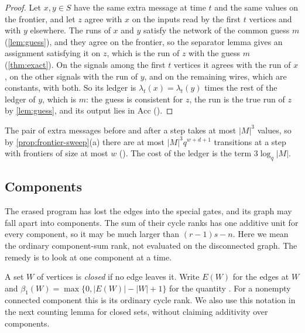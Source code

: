 \documentclass[11pt]{article}
\newcommand{\leanrefs}[1]{{\unskip\nobreak\hfil\penalty50\hskip1em\null\nobreak\hfil
  {\normalfont\small #1}\parfillskip=0pt\finalhyphendemerits=0\par}}
\newcommand{\leanref}[1]{\leanrefs{\lean{#1}}}
\theoremstyle{plain}
\theoremstyle{definition}
\theoremstyle{remark}
\newcommand{\Acc}{\mathrm{Acc}}
\newcommand{\card}[1]{\lvert #1\rvert}
\begin{document}

\begin{proof}
Let $x, y \in S$ have the same extra message at time $t$ and the same values on the frontier,
and let $z$ agree with $x$ on the inputs read by the first $t$ vertices and with $y$ elsewhere.
The runs of $x$ and $y$ satisfy the network of the common guess $m$ (\cref{lem:guess}), and they
agree on the frontier, so the separator lemma gives an assignment satisfying it on $z$, which is
the run of $z$ with the guess $m$ (\cref{thm:exact}). On the signals among the first $t$
vertices it agrees with the run of $x$, on the other signals with the run of $y$, and on the
remaining wires, which are constants, with both. So its ledger is $\lambda_t(x) = \lambda_t(y)$
times the rest of the ledger of $y$, which is $m$: the guess is consistent for $z$, the run is
the true run of $z$ by \cref{lem:guess}, and its output lies in $\Acc$
().
\end{proof}

The pair of extra messages before and after a step takes at most $\card M^3$ values, so by
\cref{prop:frontier-sweep}(a) there are at most $\card M^3 q^{w + d + 1}$ transitions at a step
with frontiers of size at most $w$ (). The cost of
the ledger is the term $3\log_q\card M$.

\subsection{Components}

The erased program has lost the edges into the special gates, and its graph may fall apart into
components. The sum of their cycle ranks has one additive unit for every component, so it may
be much larger than $(r-1)s-n$. Here we mean the ordinary component-sum rank, not
 evaluated on the disconnected graph. The remedy
is to look at one component at a time.

A set $W$ of vertices is \emph{closed} if no edge leaves it. Write $E(W)$ for the edges at $W$
and $\beta_1(W)=\max\{0,\card{E(W)}-\card W+1\}$ for the quantity
. For a nonempty connected component this is its ordinary
cycle rank. We also use this notation in the next counting lemma for closed sets, without
claiming additivity over components.
\end{document}
